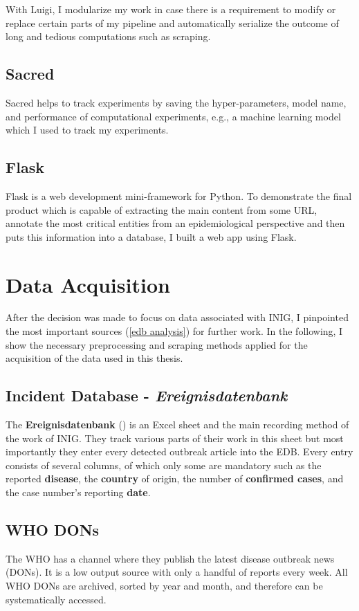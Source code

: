 With Luigi, I modularize my work in case there is a requirement to modify or replace certain parts of my pipeline and automatically serialize the outcome of long and tedious computations such as scraping.

\subsection{Sacred}
Sacred helps to track experiments by saving the hyper-parameters, model name, and performance of computational experiments, e.g., a machine learning model which I used to track my experiments.

\subsection{Flask}
Flask is a web development mini-framework for Python.
To demonstrate the final product which is capable of extracting the main content from some URL, annotate the most critical entities from an epidemiological perspective and then puts this information into a database, I built a web app using Flask.

\section{Data Acquisition}
After the decision was made to focus on data associated with INIG, I pinpointed the most important sources (\ref{edb analysis}) for further work. In the following, I show the necessary preprocessing and scraping methods applied for the acquisition of the data used in this thesis.

\subsection{Incident Database - \textit{Ereignisdatenbank}}
The \textbf{Ereignisdatenbank} () is an Excel sheet and the main recording method of the work of INIG. They track various parts of their work in this sheet but most importantly they enter every detected outbreak article into the EDB. Every entry consists of several columns, of which only some are mandatory such as the reported \textbf{disease}, the \textbf{country} of origin, the number of \textbf{confirmed cases}, and the case number's reporting \textbf{date}.

\subsection{WHO DONs}
The WHO has a channel where they publish the latest disease outbreak news (DONs).
It is a low output source with only a handful of reports every week.
All WHO DONs are archived, sorted by year and month, and therefore can be systematically accessed.

